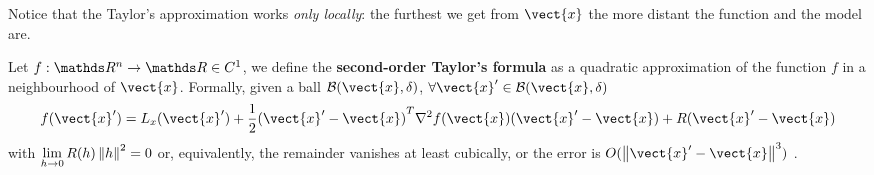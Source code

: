 \documentclass[computationalMathematics.tex]{subfiles}
\begin{document}
\noindent Notice that the Taylor's approximation works \emph{only locally}: the furthest we get from $\vect{x}$ the more distant the function and the model are.

\begin{definition}
Let $f : \R^n \to \R \in C^1$, we define the \textbf{second-order Taylor's formula}  as a quadratic approximation of the function $f$ in a neighbourhood of $\vect{x}$.
Formally, given a ball $\mathcal{B}(\vect{x}, \delta)$, $\forall \vect{x}' \in \mathcal{B}(\vect{x}, \delta)$
\[
  f(\vect{x}') = L_x(\vect{x}') + \frac{1}{2} \tr{(\vect{x}' - \vect{x})} \nabla^2 f(\vect{x}) (\vect{x}' - \vect{x}) + R(\vect{x}' - \vect{x})
\]
  with $\lim\limits_{h \to 0} R(h) \left\lVert h\right\rVert^2 = 0$ or, equivalently, the remainder vanishes at least cubically, or the error is $O(\norm{\vect{x}' - \vect{x}}^3)$ .
\end{definition}
\end{document}
